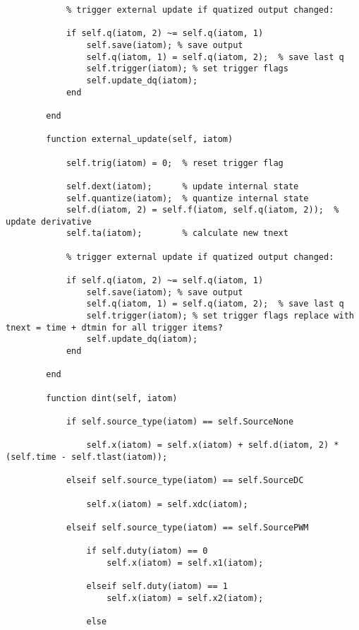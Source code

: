 \begin{lstlisting}
            % trigger external update if quatized output changed:
            
            if self.q(iatom, 2) ~= self.q(iatom, 1)
                self.save(iatom); % save output 
                self.q(iatom, 1) = self.q(iatom, 2);  % save last q
                self.trigger(iatom); % set trigger flags
                self.update_dq(iatom);
            end
 
        end
        
        function external_update(self, iatom)
           
            self.trig(iatom) = 0;  % reset trigger flag
            
            self.dext(iatom);      % update internal state
            self.quantize(iatom);  % quantize internal state
            self.d(iatom, 2) = self.f(iatom, self.q(iatom, 2));  % update derivative 
            self.ta(iatom);        % calculate new tnext

            % trigger external update if quatized output changed:
            
            if self.q(iatom, 2) ~= self.q(iatom, 1)
                self.save(iatom); % save output 
                self.q(iatom, 1) = self.q(iatom, 2);  % save last q
                self.trigger(iatom); % set trigger flags replace with tnext = time + dtmin for all trigger items?
                self.update_dq(iatom);
            end
            
        end
        
        function dint(self, iatom)
            
            if self.source_type(iatom) == self.SourceNone
                
                self.x(iatom) = self.x(iatom) + self.d(iatom, 2) * (self.time - self.tlast(iatom));
            
            elseif self.source_type(iatom) == self.SourceDC
                
                self.x(iatom) = self.xdc(iatom);
                
            elseif self.source_type(iatom) == self.SourcePWM
                
                if self.duty(iatom) == 0
                    self.x(iatom) = self.x1(iatom);
                    
                elseif self.duty(iatom) == 1
                    self.x(iatom) = self.x2(iatom);

                else


\end{lstlisting}
